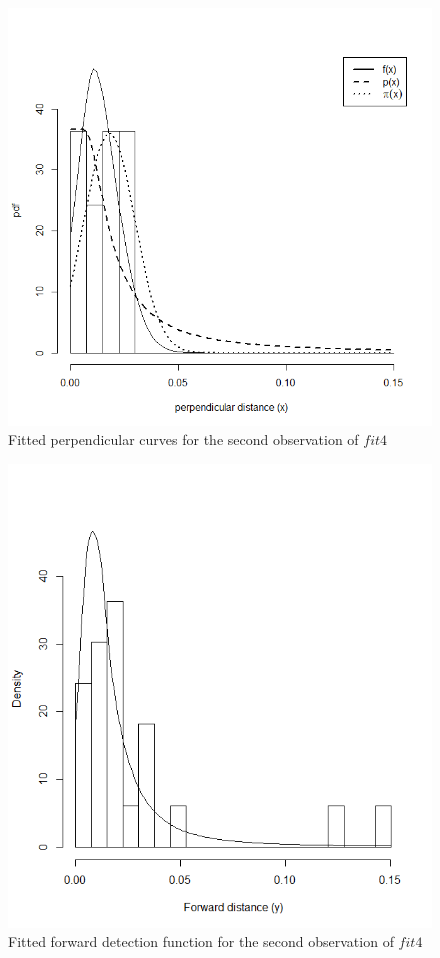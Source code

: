\documentclass[11pt]{article}
\begin{document}
\begin{multicols}{2}
\begin{figure}[H]
\center
\includegraphics[scale=0.5]{fig14}
\caption{Fitted perpendicular curves for the second observation of $fit4$}
\end{figure}

\begin{figure}[H]
\center
\includegraphics[scale=0.5]{fig15}
\caption{Fitted forward detection function for the second observation of $fit4$}
\end{figure}




\end{multicols}
\end{document}
